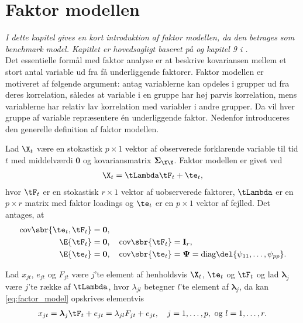 \chapter{Faktor modellen} \label{ch:dfm}
\textit{I dette kapitel gives en kort introduktion af faktor modellen, da den betrages som benchmark model. Kapitlet er hovedsagligt baseret på \citep{stock_watson_2002a} og kapitel 9 i \citep{faktorbook}.} \\[4mm]
%
Det essentielle formål med faktor analyse er at beskrive kovariansen mellem et stort antal variable ud fra få underliggende faktorer.
Faktor modellen er motiveret af følgende argument: antag variablerne kan opdeles i grupper ud fra deres korrelation, således at variable i en gruppe har høj parvis korrelation, mens variablerne har relativ lav korrelation med variabler i andre grupper.
Da vil hver gruppe af variable repræsentere én underliggende faktor.
Nedenfor introduceres den generelle definition af faktor modellen.
%
\begin{defn} \label{def:faktor_model}
Lad \(\X_t\) være en stokastisk \(p \times 1\) vektor af observerede forklarende variable til tid \(t\) med middelværdi \(\mathbf{0}\) og kovariansmatrix \(\boldsymbol{\Sigma}_{\X \X}\).
Faktor modellen er givet ved
\begin{align}
\X_t = \tLambda \tF_t + \te_t, \label{eq:factor_model}
\end{align}
hvor \(\tF_t\) er en stokastisk \(r \times 1\) vektor af uobserverede faktorer, \(\tLambda\) er en \(p \times r\) matrix med faktor loadings og \(\te_t\) er en \(p \times 1\) vektor af fejlled.
Det antages, at
\begin{align*}
\text{cov} \sbr{\te_t, \tF_t} &= \mathbf{0}, \\
\E{\tF_t} &= \mathbf{0}, \quad \text{cov}\sbr{\tF_t} = \mathbf{I}_r, \\
\E{\te_t} &= \mathbf{0}, \quad \text{cov}\sbr{\te_t} = \boldsymbol{\Psi} = \text{diag} \del{\psi_{11}, \ldots, \psi_{pp}}.
\end{align*}
\end{defn}
%
Lad \(x_{jt}\), \( e_{jt}\) og \(F_{jt}\) være \(j\)'te element af henholdsvis \(\X_t\), \(\te_t\) og \(\tF_t\) og lad \(\boldsymbol{\lambda}_j \) være \(j\)'te række af \(\tLambda\), hvor \(\lambda_{jl}\) betegner \(l\)'te element af \(\boldsymbol{\lambda}_j \), da kan \eqref{eq:factor_model} opskrives elementvis
\begin{align*}
x_{jt} = \boldsymbol{\lambda}_j \tF_t + e_{jt} = \lambda_{jl}F_{jt} + e_{jt}, \quad j = 1, \ldots, p, \text{ og } l = 1, \ldots, r.
\end{align*} 
